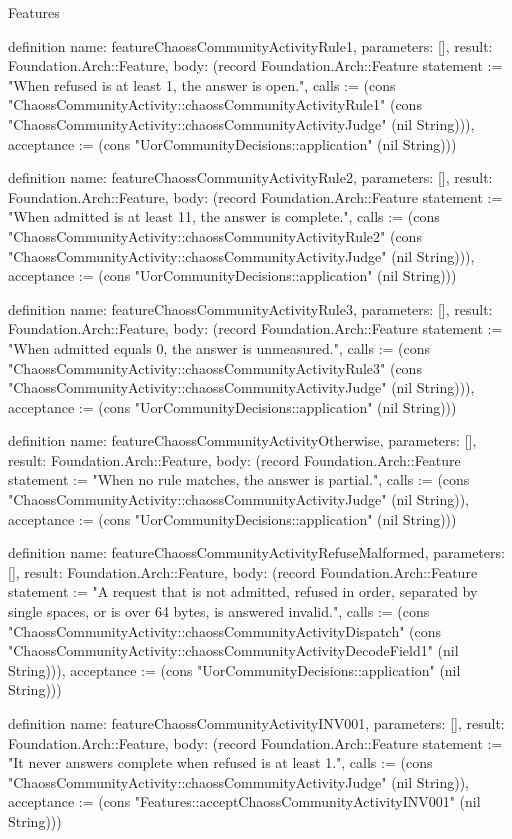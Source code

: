 \begin{lexlean}{Features}
\begin{semanticmodule}
definition{
  name: featureChaossCommunityActivityRule1,
  parameters: [],
  result: Foundation.Arch::Feature,
  body: (record Foundation.Arch::Feature {statement := "When refused is at least 1, the answer is open.", calls := (cons "ChaossCommunityActivity::chaossCommunityActivityRule1" (cons "ChaossCommunityActivity::chaossCommunityActivityJudge" (nil String))), acceptance := (cons "UorCommunityDecisions::application" (nil String))})
}

definition{
  name: featureChaossCommunityActivityRule2,
  parameters: [],
  result: Foundation.Arch::Feature,
  body: (record Foundation.Arch::Feature {statement := "When admitted is at least 11, the answer is complete.", calls := (cons "ChaossCommunityActivity::chaossCommunityActivityRule2" (cons "ChaossCommunityActivity::chaossCommunityActivityJudge" (nil String))), acceptance := (cons "UorCommunityDecisions::application" (nil String))})
}

definition{
  name: featureChaossCommunityActivityRule3,
  parameters: [],
  result: Foundation.Arch::Feature,
  body: (record Foundation.Arch::Feature {statement := "When admitted equals 0, the answer is unmeasured.", calls := (cons "ChaossCommunityActivity::chaossCommunityActivityRule3" (cons "ChaossCommunityActivity::chaossCommunityActivityJudge" (nil String))), acceptance := (cons "UorCommunityDecisions::application" (nil String))})
}

definition{
  name: featureChaossCommunityActivityOtherwise,
  parameters: [],
  result: Foundation.Arch::Feature,
  body: (record Foundation.Arch::Feature {statement := "When no rule matches, the answer is partial.", calls := (cons "ChaossCommunityActivity::chaossCommunityActivityJudge" (nil String)), acceptance := (cons "UorCommunityDecisions::application" (nil String))})
}

definition{
  name: featureChaossCommunityActivityRefuseMalformed,
  parameters: [],
  result: Foundation.Arch::Feature,
  body: (record Foundation.Arch::Feature {statement := "A request that is not admitted, refused in order, separated by single spaces, or is over 64 bytes, is answered invalid.", calls := (cons "ChaossCommunityActivity::chaossCommunityActivityDispatch" (cons "ChaossCommunityActivity::chaossCommunityActivityDecodeField1" (nil String))), acceptance := (cons "UorCommunityDecisions::application" (nil String))})
}

definition{
  name: featureChaossCommunityActivityINV001,
  parameters: [],
  result: Foundation.Arch::Feature,
  body: (record Foundation.Arch::Feature {statement := "It never answers complete when refused is at least 1.", calls := (cons "ChaossCommunityActivity::chaossCommunityActivityJudge" (nil String)), acceptance := (cons "Features::acceptChaossCommunityActivityINV001" (nil String))})
}


\end{semanticmodule}
\end{lexlean}
